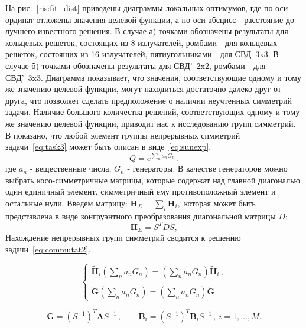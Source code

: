 На рис.~\ref{ris:fit_dist} приведены диаграммы локальных оптимумов, где по оси ординат отложены значения целевой функции, а по оси
абсцисс - расстояние до лучшего известного решения. В случае а) точками обозначены результаты для кольцевых решеток, состоящих из 8 излучателей, ромбами - для кольцевых решеток, состоящих из 16 излучателей, пятиугольниками - для СВД~3x3. В случае б) точками обозначены результаты для СВД'~2x2, ромбами - для СВД'~3x3. Диаграмма показывает, что значения, соответствующие одному и тому же значению целевой функции, могут находиться достаточно далеко друг от друга, что позволяет сделать предположение о наличии неучтенных симметрий задачи.
Наличие большого количества решений, соответствующих одному и тому же значению целевой функции, приводит нас к исследованию групп симметрий. В\autocite{yurkov:symmetry} показано, что любой элемент группы непрерывных симметрий задачи~\ref{eq:task3} может быть описан в виде~\ref{eq:sunexp}.
\begin{equation}
\label{eq:sunexp}
Q=e^{\sum\limits_n a_n G_n} \, .
\end{equation}
где $a_n$ - вещественные числа, $G_n$ - генераторы. В качестве генераторов можно выбрать косо-симметричные матрицы, которые содержат над главной диагональю один единичный элемент, симметричный ему противоположный элемент и остальные нули.
Введем матрицу: $ {\textbf{H}}_{\Sigma} = \sum_{i} \textbf{H}_i,$ которая может быть представлена в виде конгруэнтного преобразования диагональной матрицы $D$:
$${\textbf{H}}_{\Sigma} = S^TDS,$$
Нахождение непрерывных групп симметрий сводится к решению задачи~\ref{eq:commutat2}.

\begin{equation}
\label{eq:commutat2}
\left\{
\begin{array}{l}
\displaystyle
\tilde{\textbf{H}}_i \left(\sum\limits_na_nG_n\right) =
\left(\sum\limits_na_nG_n\right)\tilde{\textbf{H}}_i \, , \\ \\
\displaystyle
\tilde{\textbf{G}} \left(\sum\limits_na_nG_n\right) = \left(\sum\limits_na_nG_n\right)\tilde{\textbf{G}} \, .
\end{array}
\right.
\end{equation}

\begin{equation}
\tilde{\textbf{G}}=\left(S^{-1}\right)^T \textbf{A} S^{-1} \, , \qquad
\tilde{\textbf{B}_i}=\left(S^{-1}\right)^T \textbf{B}_i S^{-1} \, , \ i=1,\dots,M.
\end{equation}

